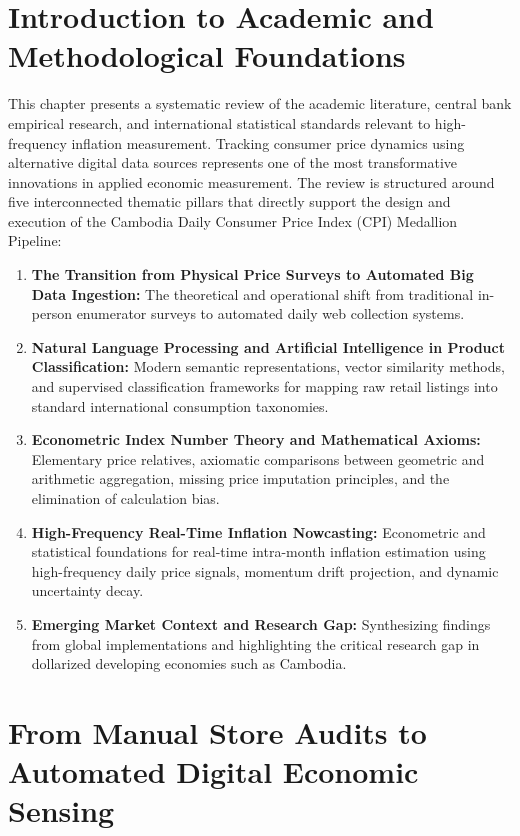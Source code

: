 
\section{Introduction to Academic and Methodological Foundations}
\hs This chapter presents a systematic review of the academic literature, central bank empirical research, and international statistical standards relevant to high-frequency inflation measurement. Tracking consumer price dynamics using alternative digital data sources represents one of the most transformative innovations in applied economic measurement. The review is structured around five interconnected thematic pillars that directly support the design and execution of the Cambodia Daily Consumer Price Index (CPI) Medallion Pipeline:
\begin{enumerate}
    \item \textbf{The Transition from Physical Price Surveys to Automated Big Data Ingestion:} The theoretical and operational shift from traditional in-person enumerator surveys to automated daily web collection systems.
    \item \textbf{Natural Language Processing and Artificial Intelligence in Product Classification:} Modern semantic representations, vector similarity methods, and supervised classification frameworks for mapping raw retail listings into standard international consumption taxonomies.
    \item \textbf{Econometric Index Number Theory and Mathematical Axioms:} Elementary price relatives, axiomatic comparisons between geometric and arithmetic aggregation, missing price imputation principles, and the elimination of calculation bias.
    \item \textbf{High-Frequency Real-Time Inflation Nowcasting:} Econometric and statistical foundations for real-time intra-month inflation estimation using high-frequency daily price signals, momentum drift projection, and dynamic uncertainty decay.
    \item \textbf{Emerging Market Context and Research Gap:} Synthesizing findings from global implementations and highlighting the critical research gap in dollarized developing economies such as Cambodia.
\end{enumerate}

\section{From Manual Store Audits to Automated Digital Economic Sensing}
